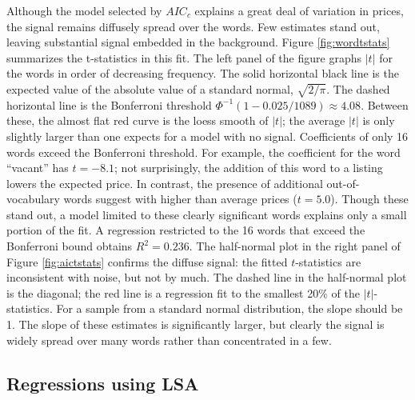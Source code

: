 \documentclass[12pt]{article}
\begin{document}
 
Although the model selected by $AIC_c$ explains a great deal of variation in prices, the signal remains diffusely spread over the words.  Few estimates stand out, leaving substantial signal embedded in the background.   Figure \ref{fig:wordtstats} summarizes the t-statistics in this fit. The left panel of the figure graphs $|t|$ for the words in order of decreasing frequency.  The solid horizontal black line is the expected value of the absolute value of a standard normal, $\sqrt{2/\pi}$. The dashed horizontal line is the Bonferroni threshold $\Phi^{-1}(1-0.025/1089) \approx 4.08$.  Between these, the almost flat red curve is the loess smooth of  $|t|$; the average $|t|$ is only slightly larger than one expects for a model with no signal.   Coefficients of only 16 words exceed the Bonferroni threshold.  For example,
 the coefficient for the word ``vacant'' has $t=-8.1$; not  surprisingly, the
 addition of this word to a listing lowers the expected price.  In
 contrast, the presence of additional out-of-vocabulary words
 suggest with higher than average prices ($t=5.0$).   Though these stand out, a model limited to these clearly significant words explains only a small portion of the fit.  A regression restricted to the 16 words that exceed the Bonferroni bound obtains
 $R^2 = 0.236$. The half-normal plot in the right panel of
 Figure \ref{fig:aictstats} confirms the diffuse signal: the fitted $t$-statistics are inconsistent with noise, but not by much.  The dashed line in the half-normal plot is the diagonal; the red
 line is a  regression fit to the smallest 20\% of the $|t|$-statistics.  For a sample from a standard normal distribution, the slope should be 1.  The slope of these estimates is significantly larger, but clearly the signal is
 widely spread over many words rather than concentrated in a few.
   

 \subsection{ Regressions using LSA }  %
\end{document}
